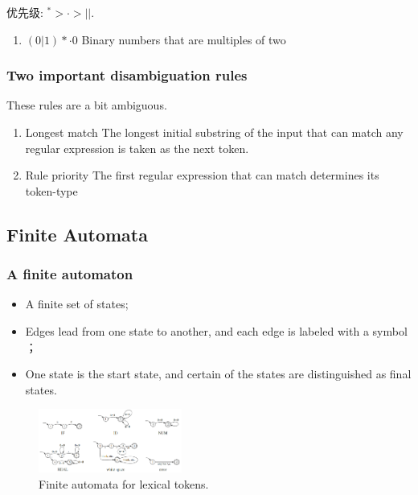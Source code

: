 优先级: ${}^*> \cdot > ||$.

\begin{example}\quad

    \begin{enumerate}
        \item $(0|1)*\cdot0$
        \subitem Binary numbers that are multiples of two
    \end{enumerate}
\end{example}

\subsubsection{Two important disambiguation rules}
These rules are a bit ambiguous.

\begin{enumerate}
    \item Longest match
    \subitem The longest initial substring of the input that can match any regular expression is taken as the next token.
    \item Rule priority
    \subitem The first regular expression that can match determines its token-type
\end{enumerate}

\subsection{Finite Automata}
\subsubsection{A finite automaton}
\begin{definition}\quad 
    \begin{itemize}
        \item A finite set of states;
        \item Edges lead from one state to another, and each edge is labeled with a symbol ；
        \item One state is the start state, and certain of the states are distinguished as final states.
    \end{itemize}
\end{definition}

\begin{figure}[!htb]
    \centering
    \includegraphics[width=0.42\textwidth]{pic/CP2/Finite automata for lexical tokens.}
    \caption{Finite automata for lexical tokens.}
\end{figure}

